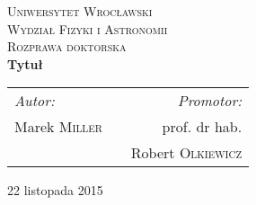 \begin{titlepage}

\begin{center}

\textsc{\LARGE Uniwersytet Wrocławski}\\[0.5cm]
\textsc{\Large Wydział Fizyki i Astronomii} \\[1.5cm]
\textsc{\Large Rozprawa doktorska} \\[2cm]

{ \huge \bfseries Tytuł}\\[2cm]

{ \large
\begin{center}
\begin{tabular}{lcr}
\emph{Autor:} & \hspace{3cm} & \emph{Promotor:}\\
Marek \textsc{Miller} & & prof. dr hab. \\
    & & Robert \textsc{Olkiewicz}
\end{tabular}
\end{center}
}

\vfill


{\large 22 listopada 2015}
\end{center}

\end{titlepage}
